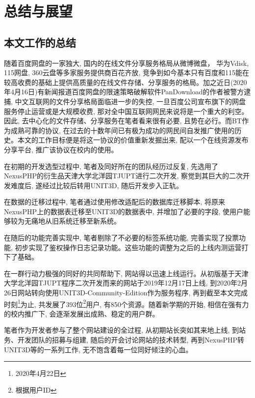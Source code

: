 
\chapter{总结与展望}


\section{本文工作的总结}

随着百度网盘的一家独大, 国内的在线文件分享服务格局从微博微盘， 华为Vdisk, 115网盘, 360云盘等多家服务提供商百花齐放, 竞争到如今基本只有百度和115能在较高收费的基础上提供高质量的在线文件存储、分享服务的格局。加之近日(2020年4月16日)有新闻报道百度网盘的限速策略破解软件PanDownload的作者被警方逮捕\cite{sina2020pandownload}, 中文互联网的文件分享格局面临进一步的失控, 一旦百度公司宣布旗下的网盘服务停止运营或是大规模收费, 那对全中国互联网网民来说将是一个重大的利空。因此, 去中心化的文件存储、分享服务在笔者看来很有必要, 且势在必行。而BT作为成熟可靠的协议, 在过去的十数年间已有极为成功的网民间自发推广使用的历史。本文的工作目标便是将这一协议的价值重新发掘出来, 配以一个在线资源发布分享平台, 推广该协议在校内的使用。

在初期的开发选型过程中, 笔者及同好所在的团队经历过反复, 先选用了NexusPHP的衍生品天津大学北洋园TJUPT进行二次开发, 察觉到其巨大的二次开发难度后, 遂经过比较后转用UNIT3D, 随后开发步入正轨。

在数据的迁移过程中, 笔者通过使用修改适配后的数据库迁移脚本, 将原来NexusPHP上的数据表迁移至UNIT3D的数据表中, 并增加了必要的字段, 使用户能够较为无痛地从旧系统迁移至新系统。

在随后的功能完善实现中, 笔者剔除了不必要的标签系统功能, 完善实现了投票功能, 初步实现了鉴权操作日志记录功能。这些功能的调整为之后的上线内测运营打下了基础。

在一群行动力极强的同好的共同帮助下, 网站得以迅速上线运行。从初版基于天津大学北洋园TJUPT程序二次开发而来的网站于2019年12月17日上线, 到2020年2月26日网站转向使用UNIT3D-Community-Edition作为服务程序, 再到截至本文完成时刻\footnote{2020年4月22日}为止, 共发展了393位\footnote{根据用户ID}用户, 有850个资源。随着新学期的开始, 相信在强有力的校内推广下, 会逐渐发展出成熟、稳定的用户群。

笔者作为开发者参与了整个网站建设的全过程, 从初期站长突如其来地上线, 到站务、开发团队的招募与组建, 随后的开会讨论网站的技术转型, 再到NexusPHP转UNIT3D等的一系列工作, 无不饱含着每一位同好倾注的心血。

